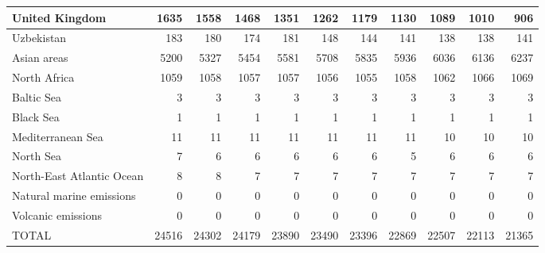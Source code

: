 \begin{table}
\begin{tabular}{|l|r|r|r|r|r|r|r|r|r|r|}
                United Kingdom&   1635&   1558&   1468&   1351&   1262&   1179&   1130&   1089&   1010&    906\\\hline
                    Uzbekistan&    183&    180&    174&    181&    148&    144&    141&    138&    138&    141\\\hline
                   Asian areas&   5200&   5327&   5454&   5581&   5708&   5835&   5936&   6036&   6136&   6237\\\hline
                  North Africa&   1059&   1058&   1057&   1057&   1056&   1055&   1058&   1062&   1066&   1069\\\hline
                    Baltic Sea&      3&      3&      3&      3&      3&      3&      3&      3&      3&      3\\\hline
                     Black Sea&      1&      1&      1&      1&      1&      1&      1&      1&      1&      1\\\hline
             Mediterranean Sea&     11&     11&     11&     11&     11&     11&     11&     10&     10&     10\\\hline
                     North Sea&      7&      6&      6&      6&      6&      6&      5&      6&      6&      6\\\hline
     North-East Atlantic Ocean&      8&      8&      7&      7&      7&      7&      7&      7&      7&      7\\\hline
      Natural marine emissions&      0&      0&      0&      0&      0&      0&      0&      0&      0&      0\\\hline
            Volcanic emissions&      0&      0&      0&      0&      0&      0&      0&      0&      0&      0\\\hline\hline
                         TOTAL&  24516&  24302&  24179&  23890&  23490&  23396&  22869&  22507&  22113&  21365\\\hline
 \end{tabular}
 \end{table}
 
